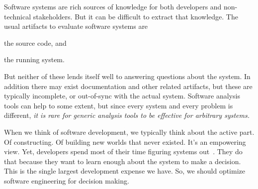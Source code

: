 \documentclass[sigconf,screen]{acmart}
\newcommand\cp[1]{\nbe{Cesare}{#1}{olive}} %
\newcommand\ws[1]{\nbe{Workshop}{#1}{teal}} %
\begin{document}

Software systems are rich sources of knowledge for both developers and non-technical stakeholders.
But it can be difficult to extract that knowledge.
The usual artifacts to evaluate software systems are
\begin{inparaenum}[(i)]
\item the source code, and
\item the running system.
\end{inparaenum}
But neither of these lends itself well to answering questions about the system.
In addition there may exist documentation and other related artifacts, but these are typically incomplete, or out-of-sync with the actual system.
Software analysis tools can help to some extent, but since every system and every problem is different, \emph{it is rare for generic analysis tools to be effective for arbitrary systems.}

When we think of software development, we typically think about the active part.
Of constructing.
Of building new worlds that never existed.
It's an empowering view.
Yet, developers spend most of their time figuring systems out~\cite{Xia18a}.
They do that because they want to learn enough about the system to make a decision.
This is the single largest development expense we have.
So, we should optimize software engineering for decision making.
\end{document}

